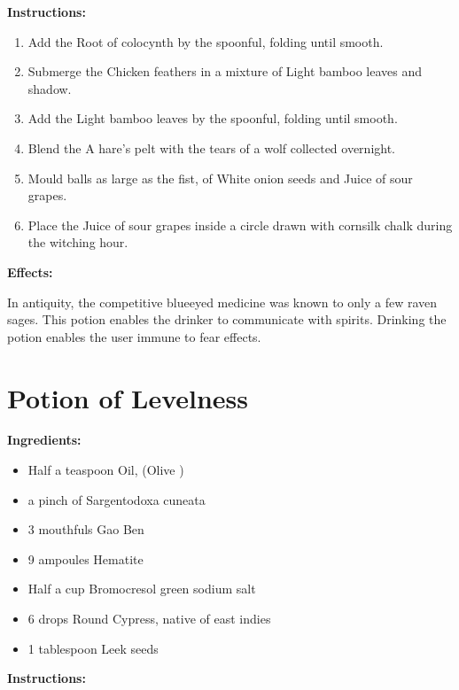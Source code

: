 \documentclass{article}
\begin{document}
\textbf{Instructions:}

\begin{enumerate}
  \item Add the Root of colocynth by the spoonful, folding until smooth.
  \item Submerge the Chicken feathers in a mixture of Light bamboo leaves and shadow.
  \item Add the Light bamboo leaves by the spoonful, folding until smooth.
  \item Blend the A hare's pelt with the tears of a wolf collected overnight.
  \item Mould balls as large as the fist, of White onion seeds and Juice of sour grapes.
  \item Place the Juice of sour grapes inside a circle drawn with cornsilk chalk during the witching hour.
\end{enumerate}

\textbf{Effects:}

In antiquity, the competitive blueeyed medicine was known to only a few raven sages. This potion enables the drinker to communicate with spirits. Drinking the potion enables the user immune to fear effects.

\newpage
\section*{Potion of Levelness}

\textbf{Ingredients:}

\begin{itemize}
  \item Half a teaspoon Oil, (Olive )
  \item a pinch of Sargentodoxa cuneata
  \item 3 mouthfuls Gao Ben
  \item 9 ampoules Hematite
  \item Half a cup Bromocresol green sodium salt
  \item 6 drops Round Cypress, native of east indies
  \item 1 tablespoon Leek seeds
\end{itemize}

\textbf{Instructions:}
\end{document}
